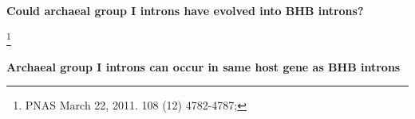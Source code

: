 \documentclass[landscape]{slides}
\begin{document}
\begin{slide}
\begin{center}
\textbf{Could archaeal group I introns have evolved into BHB introns?}
\end{center}
\footnote{PNAS March 22, 2011. 108 (12) 4782-4787;}

\textbf{Archaeal group I introns can occur in same host gene as BHB introns}

\vfill
\end{slide}
\end{document}
